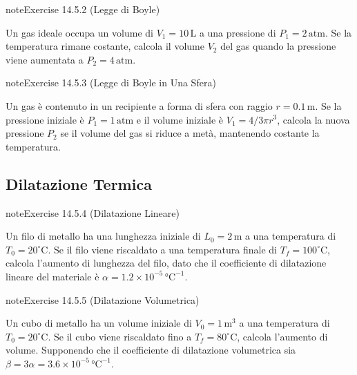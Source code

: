 \documentclass[letterpaper,10pt,italian]{jupyterBook}
\begin{document}
\begin{sphinxadmonition}{note}{Exercise 14.5.2 (Legge di Boyle)}



\sphinxAtStartPar
Un gas ideale occupa un volume di \(V_1 = 10 \, \text{L}\) a una pressione di \(P_1 = 2 \, \text{atm}\). Se la temperatura rimane costante, calcola il volume \(V_2\) del gas quando la pressione viene aumentata a \(P_2 = 4 \, \text{atm}\).
\end{sphinxadmonition}
 \label{exercise:ch/thermodynamics/foundation-problems-exercise-2}

\begin{sphinxadmonition}{note}{Exercise 14.5.3 (Legge di Boyle in Una Sfera)}



\sphinxAtStartPar
Un gas è contenuto in un recipiente a forma di sfera con raggio \(r = 0.1 \, \text{m}\). Se la pressione iniziale è \(P_1 = 1 \, \text{atm}\) e il volume iniziale è \(V_1 = 4/3 \pi r^3\), calcola la nuova pressione \(P_2\) se il volume del gas si riduce a metà, mantenendo costante la temperatura.
\end{sphinxadmonition}


\subsection{Dilatazione Termica}
\label{\detokenize{ch/thermodynamics/foundation-problems:dilatazione-termica}} \label{exercise:ch/thermodynamics/foundation-problems-exercise-3}

\begin{sphinxadmonition}{note}{Exercise 14.5.4 (Dilatazione Lineare)}



\sphinxAtStartPar
Un filo di metallo ha una lunghezza iniziale di \(L_0 = 2 \, \text{m}\) a una temperatura di \(T_0 = 20^\circ \text{C}\). Se il filo viene riscaldato a una temperatura finale di \(T_f = 100^\circ \text{C}\), calcola l’aumento di lunghezza del filo, dato che il coefficiente di dilatazione lineare del materiale è \(\alpha = 1.2 \times 10^{-5} \, \text{°C}^{-1}\).
\end{sphinxadmonition}
 \label{exercise:ch/thermodynamics/foundation-problems-exercise-4}

\begin{sphinxadmonition}{note}{Exercise 14.5.5 (Dilatazione Volumetrica)}



\sphinxAtStartPar
Un cubo di metallo ha un volume iniziale di \(V_0 = 1 \, \text{m}^3\) a una temperatura di \(T_0 = 20^\circ \text{C}\). Se il cubo viene riscaldato fino a \(T_f = 80^\circ \text{C}\), calcola l’aumento di volume. Supponendo che il coefficiente di dilatazione volumetrica sia \(\beta = 3 \alpha = 3.6 \times 10^{-5} \, \text{°C}^{-1}\).
\end{sphinxadmonition}
 \label{exercise:ch/thermodynamics/foundation-problems-exercise-5}
\end{document}
